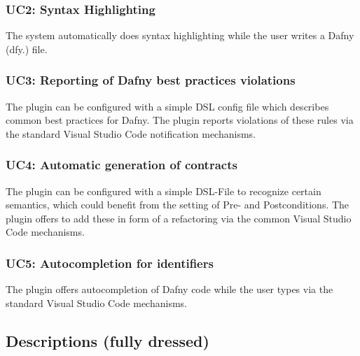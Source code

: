 \subsubsection{UC2: Syntax Highlighting}
The system automatically does syntax highlighting while the user writes a Dafny (dfy.) file.
\subsubsection{UC3: Reporting of Dafny best practices violations}
The plugin can be configured with a simple DSL config file which describes common best practices for Dafny. The plugin reports violations of these rules via the standard Visual Studio Code notification mechanisms.
\subsubsection{UC4: Automatic generation of contracts}
The plugin can be configured with a simple DSL-File to recognize certain semantics, which could benefit from the setting of Pre- and Postconditions. The plugin offers to add these in form of a refactoring via the common Visual Studio Code mechanisms.
\subsubsection{UC5: Autocompletion for identifiers}
The plugin offers autocompletion of Dafny code while the user types via the standard Visual Studio Code mechanisms.
\subsection{Descriptions (fully dressed)}
